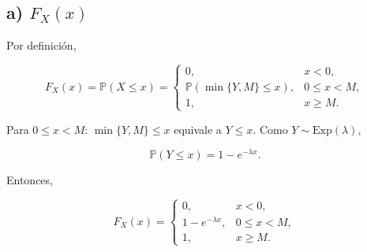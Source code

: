 \documentclass[10pt,a4paper]{article}
\begin{document}
    \begin{center}
    \end{center}
    { \hspace*{\fill} \\}
    
    \hypertarget{a-grafica-de-f_xx}{%
\subsection{\texorpdfstring{a) 
\(F_X(x)\)}{a) F\_X(x)}}\label{a-grafica-de-f_xx}}

    Por definición,

\[
F_X(x)=\mathbb P(X\leq x)=
\begin{cases}
0,&x<0,\\[2pt]
\mathbb P(\min\{Y,M\}\leq x),&0\leq x<M,\\[2pt]
1,&x\geq M.
\end{cases}
\]

Para \(0\leq x<M\): \(\min\{Y,M\}\leq x\) equivale a \(Y\leq x\). Como
\(Y\sim\mathrm{Exp}(\lambda)\),

\[
\mathbb P(Y\leq x)=1-e^{-\lambda x}.
\]

Entonces,

\[
F_X(x)=
\begin{cases}
0,&x<0,\\
1-e^{-\lambda x},&0\leq x<M,\\
1,&x\geq M.
\end{cases}
\]
\end{document}
